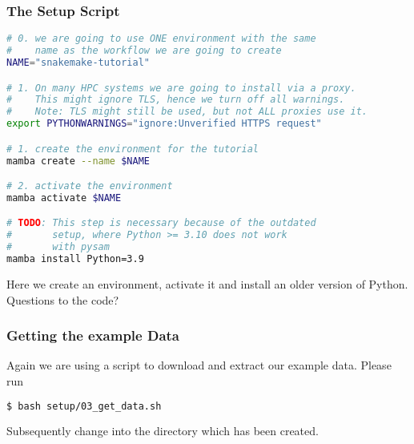 \begin{frame}[fragile]
  \frametitle{The Setup Script}
  \begin{lstlisting}[language=Bash, style=Shell, basicstyle=\tiny]
# 0. we are going to use ONE environment with the same
#    name as the workflow we are going to create
NAME="snakemake-tutorial"

# 1. On many HPC systems we are going to install via a proxy.
#    This might ignore TLS, hence we turn off all warnings.
#    Note: TLS might still be used, but not ALL proxies use it.
export PYTHONWARNINGS="ignore:Unverified HTTPS request"

# 1. create the environment for the tutorial
mamba create --name $NAME

# 2. activate the environment
mamba activate $NAME

# TODO: This step is necessary because of the outdated 
#       setup, where Python >= 3.10 does not work
#       with pysam
mamba install Python=3.9
  \end{lstlisting}
  Here we create an environment, activate it and install an older version of Python. Questions to the code?
\end{frame}

\begin{frame}[fragile]
  \frametitle{Getting the example Data}
  Again we are using a script to download and extract our example data. Please run
  \begin{lstlisting}[language=Bash, style=Shell]
$ bash setup/03_get_data.sh
  \end{lstlisting}
  Subsequently change into the directory  which has been created. 
  \pause
\end{frame}

